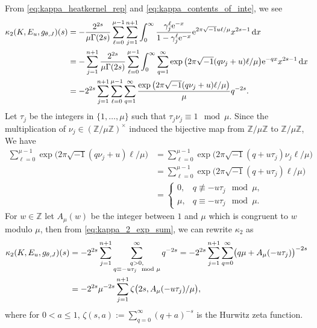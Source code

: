 \documentclass[pdftex]{sigma}
\numberwithin{equation}{section}
\newcommand{\ii}{\sqrt{-1}}
\begin{document}
From \eqref{eq:kappa_heatkernel_rep} and \eqref{eq:kappa_contents_of_inte},
we see
\begin{align}
 \kappa_{2} (K, E_{u} , g_{\theta , J} ) (s)
 & =
 -
 \frac{
 2^{2s}
 }{
 \mu \Gamma (2s)
 }
 \sum_{\ell = 0}^{\mu-1}
 \sum_{j=1}^{n+1}
 \int_{0}^{\infty} \frac{\gamma_j^{\ell} {\rm e}^{-x}}{1 - \gamma_j^{\ell} {\rm e}^{-x}}
 {\rm e}^{ 2 \pi \ii u \ell / \mu } x^{2s-1} \, {\rm d}x
 \notag
 \\
 & =
 -
 \sum_{j=1}^{n+1}
 \frac{
 2^{2s}
 }{
 \mu \Gamma (2s)
 }
 \sum_{\ell = 0}^{\mu -1}
 \int_{0}^{\infty} \sum_{q=1}^{\infty} \exp \big( 2 \pi \ii (q \nu_j + u ) \ell / \mu \big) {\rm e}^{-qx} x^{2s-1} \, {\rm d}x
 \notag \\
 & =
 -
 2^{2s}
 \sum_{j=1}^{n+1}
 \sum_{\ell = 0}^{\mu -1}
 \sum_{q=1}^{\infty}
 \frac{
 \exp \big( 2 \pi \ii (q \nu_j + u ) \ell / \mu \big)
 }{
 \mu
 }
 q^{-2s}
 .
 \label{eq:kappa_2_exp_sum}
\end{align}
Let ${\tau}_j$ be the integers in $\{ 1 , \ldots , \mu \}$ such that ${\tau}_j \nu_j \equiv 1 \mod \mu$.
Since the multiplication of $\nu_j \in ( \mathbb{Z} / \mu \mathbb{Z} )^{\times}$ induced the bijective map from $\mathbb{Z} / \mu \mathbb{Z} $ to $\mathbb{Z} / \mu \mathbb{Z} $,
We have
\begin{align*}
 \sum_{\ell = 0}^{\mu -1}
 \exp \big( 2 \pi \ii (q \nu_j + u ) \ell / \mu \big)
 & =
 \sum_{\ell = 0}^{\mu -1}
 \exp \big( 2 \pi \ii (q + u \tau_j ) \nu_j \ell / \mu \big)
 \\
 & =
 \sum_{\ell = 0}^{\mu -1}
 \exp \big( 2 \pi \ii (q + u \tau_j ) \ell / \mu \big)
 \\
 & =
 \begin{cases}
 0 , & q \not \equiv - u \tau_j \mod \mu ,
 \\
 \mu , & q \equiv - u \tau_j \mod \mu .
 \end{cases}
\end{align*}
For $w \in \mathbb{Z}$ let $A_{\mu} ( w )$ be the integer between $1$ and $\mu$ which is congruent to $w$ modulo $\mu$,
then from \eqref{eq:kappa_2_exp_sum}, we can rewrite $\kappa_{2}$ as
\begin{align}
 \kappa_{2} (K, E_{u} , g_{\theta , J} ) (s)
 & =
 -
 2^{2s}
 \sum_{j=1}^{n+1}
 \sum_{\substack{q >0 , \\ q \equiv - u {\tau}_j \mod \mu } }^{\infty}
 q^{-2s}
 =
 -
 2^{2s}
 \sum_{j=1}^{n+1}
 \sum_{q=0}^{\infty}
 \bigl(
 q \mu + A_{\mu} (- u {\tau}_j)
 \bigr)^{-2s}
 \notag
 \\
 & =
 -
 2^{2s} \mu^{-2s}
 \sum_{j=1}^{n+1}
 \zeta \bigl( 2s , A_{\mu} (-u {\tau}_j) / \mu \bigr)
 ,
 \label{eq:kappa_2}
\end{align}
where for $0 < a \leq 1$, $\zeta (s , a) := \sum_{q =0}^{\infty} (q + a)^{-s}$ is the Hurwitz zeta function.
\end{document}
